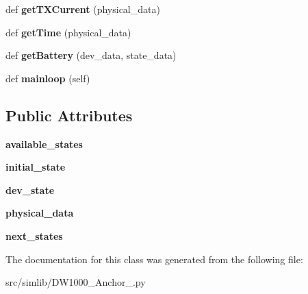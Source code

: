 \begin{DoxyCompactItemize}
def {\bfseries get\+T\+X\+Current} (physical\+\_\+data)
\item 
\mbox{\label{classsimlib_1_1_d_w1000___anchor__1_1_1_d_w1000___anchor__1_a46b306f8af2e3ac1e71ab32540f1bdd0}} 
def {\bfseries get\+Time} (physical\+\_\+data)
\item 
\mbox{\label{classsimlib_1_1_d_w1000___anchor__1_1_1_d_w1000___anchor__1_ad334ae70db4ceca36f290658894d7134}} 
def {\bfseries get\+Battery} (dev\+\_\+data, state\+\_\+data)
\item 
\mbox{\label{classsimlib_1_1_d_w1000___anchor__1_1_1_d_w1000___anchor__1_ae73367697bcd7001baf76f0583f8e295}} 
def {\bfseries mainloop} (self)
\end{DoxyCompactItemize}
\subsection*{Public Attributes}
\begin{DoxyCompactItemize}
\item 
\mbox{\label{classsimlib_1_1_d_w1000___anchor__1_1_1_d_w1000___anchor__1_ad98bffdd8c03847d372727edcf19d59d}} 
{\bfseries available\+\_\+states}
\item 
\mbox{\label{classsimlib_1_1_d_w1000___anchor__1_1_1_d_w1000___anchor__1_a98f1c19fbde45956f3a1e09b2cd9d89a}} 
{\bfseries initial\+\_\+state}
\item 
\mbox{\label{classsimlib_1_1_d_w1000___anchor__1_1_1_d_w1000___anchor__1_ace5c57689a3b5ed4f5d404d9ef0660ab}} 
{\bfseries dev\+\_\+state}
\item 
\mbox{\label{classsimlib_1_1_d_w1000___anchor__1_1_1_d_w1000___anchor__1_aadcde7bf26965a132040961a7ddfc627}} 
{\bfseries physical\+\_\+data}
\item 
\mbox{\label{classsimlib_1_1_d_w1000___anchor__1_1_1_d_w1000___anchor__1_a852645997e25e304378d4d80442bda41}} 
{\bfseries next\+\_\+states}
\end{DoxyCompactItemize}


The documentation for this class was generated from the following file\+:\begin{DoxyCompactItemize}
\item 
src/simlib/D\+W1000\+\_\+\+Anchor\+\_.\+py\end{DoxyCompactItemize}
